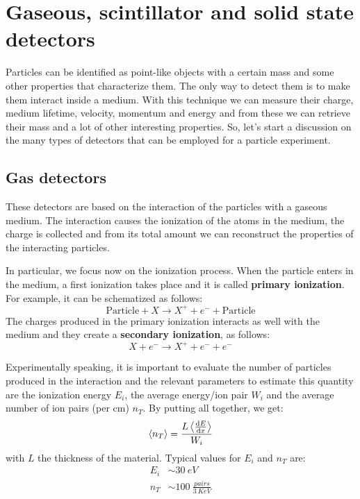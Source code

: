 \documentclass[../../main/main.tex]{subfiles}
\begin{document}
\section{Gaseous, scintillator and solid state detectors}
Particles can be identified as point-like objects with a certain mass and some other properties that characterize them. The only way to detect them is to make them interact inside a medium. With this technique we can measure their charge, medium lifetime, velocity, momentum and energy and from these we can retrieve their mass and a lot of other interesting properties. So, let's start a discussion on the many types of detectors that can be employed for a particle experiment.



\subsection{Gas detectors}
These detectors are based on the interaction of the particles with a gaseous medium. The interaction causes the ionization of the atoms in the medium, the charge is collected and from its total amount we can reconstruct the properties of the interacting particles.

In particular, we focus now on the ionization process. When the particle enters in the medium, a first ionization takes place and it is called \textbf{primary ionization}. For example, it can be schematized as follows:
\begin{equation}
    \text{Particle} + X \longrightarrow X^+ + e^- + \text{Particle}
    \label{eq:L04_PIP}
\end{equation}
The charges produced in the primary ionization interacts as well with the medium and they create a \textbf{secondary ionization}, as follows:
\begin{equation}
    X + e^- \longrightarrow X^+ + e^- + e^-
    \label{eq:L04_SIP}
\end{equation}

Experimentally speaking, it is important to evaluate the number of particles produced in the interaction and the relevant parameters to estimate this quantity are the ionization energy \( E_i \), the average energy/ion pair \( W_i \) and the average number of ion pairs (per cm) \( n_T \). By putting all together, we get:
\begin{equation}
    \left\langle n_T \right\rangle
    =
    \frac{L \left\langle \dv{E}{x} \right\rangle}{W_i}
    \label{eq:L04_INOP}
\end{equation}
with \( L \) the thickness of the material. Typical values for \( E_i \) and \( n_T \) are:
\begin{align*}
	E_i &\sim 30 \ \si{eV}	\\
	n_T &\sim 100 \ \si{\frac{pairs}{3 \ KeV}}
\end{align*}
\end{document}
